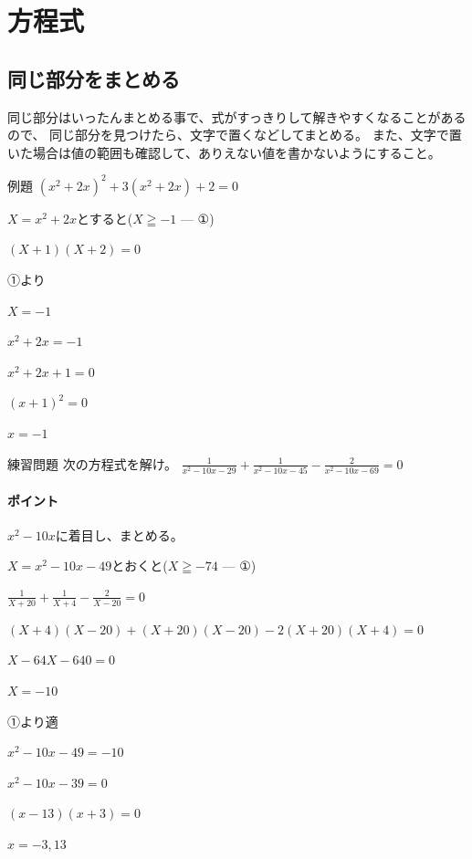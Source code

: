 \documentclass[uplatex,fleqn]{jsbook}
\begin{document}
\section{方程式}
\subsection{同じ部分をまとめる}
同じ部分はいったんまとめる事で、式がすっきりして解きやすくなることがあるので、
同じ部分を見つけたら、文字で置くなどしてまとめる。
また、文字で置いた場合は値の範囲も確認して、ありえない値を書かないようにすること。

\begin{problem}{例題}
    $\left(x^2+2x\right)^2+3\left(x^2+2x\right)+2=0$

    $X=x^2+2x$とすると($X\geqq-1$ --- ①)

    $\left(X+1\right)\left(X+2\right)=0$

    ①より

    $X=-1$

    $x^2+2x=-1$

    $x^2+2x+1=0$

    $\left(x+1\right)^2=0$

    $x=-1$
\end{problem}

\begin{problem}{練習問題}
    次の方程式を解け。
    $\displaystyle \frac{1}{x^2-10x-29}+\frac{1}{x^2-10x-45}-\frac{2}{x^2-10x-69}=0$
\end{problem}

\paragraph{ポイント}$x^2-10x$に着目し、まとめる。


\begin{answer}
    $X=x^2-10x-49$とおくと($X\geqq-74$ --- ①)

    $\displaystyle \frac{1}{X+20}+\frac{1}{X+4}-\frac{2}{X-20}=0$

    $\left(X+4\right)\left(X-20\right)+\left(X+20\right)\left(X-20\right)-2\left(X+20\right)\left(X+4\right)=0$

    $X-64X-640=0$

    $X=-10$

    ①より適

    $x^2-10x-49=-10$

    $x^2-10x-39=0$

    $\left(x-13\right)\left(x+3\right)=0$

    $x=-3,13$
\end{answer}
\end{document}
